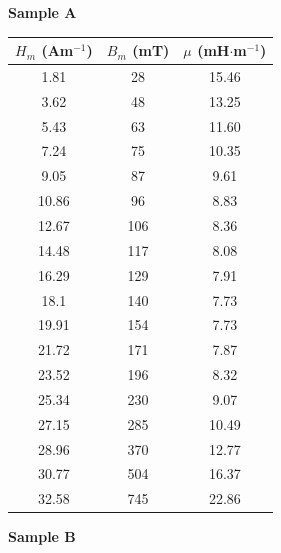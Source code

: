 \documentclass{article}
\begin{document}
\begin{table}[h]

	\centering
	\begin{minipage}{0.48\textwidth}
		\centering
		\textbf{Sample A}\\[0.5em]
		\begin{tabular}{ccc}
			\toprule
			$H_m$ (Am$^{-1}$) & $B_m$ (mT) & $\mu$ (mH$\cdot$m$^{-1}$) \\
			\midrule
			1.81              & 28         & 15.46                     \\
			3.62              & 48         & 13.25                     \\
			5.43              & 63         & 11.60                     \\
			7.24              & 75         & 10.35                     \\
			9.05              & 87         & 9.61                      \\
			10.86             & 96         & 8.83                      \\
			12.67             & 106        & 8.36                      \\
			14.48             & 117        & 8.08                      \\
			16.29             & 129        & 7.91                      \\
			18.1              & 140        & 7.73                      \\
			19.91             & 154        & 7.73                      \\
			21.72             & 171        & 7.87                      \\
			23.52             & 196        & 8.32                      \\
			25.34             & 230        & 9.07                      \\
			27.15             & 285        & 10.49                     \\
			28.96             & 370        & 12.77                     \\
			30.77             & 504        & 16.37                     \\
			32.58             & 745        & 22.86                     \\
			\bottomrule
		\end{tabular}
	\end{minipage}%
	\hfill
	\begin{minipage}{0.48\textwidth}
		\centering
		\textbf{Sample B}\\[0.5em]

\end{minipage}
\end{table}
\end{document}
